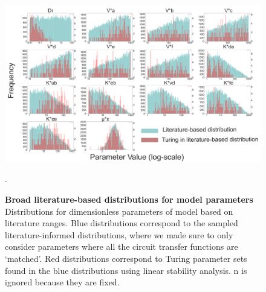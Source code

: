\begin{figure}[H] %
    \centering
    \begin{adjustbox}{center}
        \includegraphics[width=1.2\textwidth]{chapters/Chapter 2/param_distributions} %
    \end{adjustbox}
    \caption{\textbf{Broad literature-based distributions for model parameters} Distributions for dimensionless parameters of model based on literature ranges. Blue distributions correspond to the sampled literature-informed distributions, where we made sure to only consider parameters where all the circuit transfer functions are ‘matched’. Red distributions correspond to Turing parameter sets found in the blue distributions using linear stability analysis. n is ignored because they are fixed. }. %
    \label{fig:param_distributions_turing_vs_noturing} %
\end{figure}

